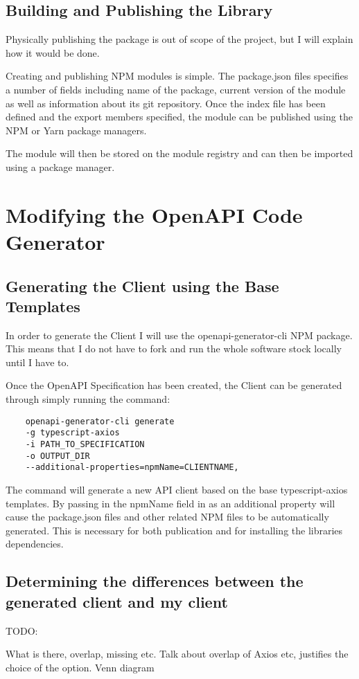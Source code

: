 \subsection{Building and Publishing the Library}
    Physically publishing the package is out of scope of the project, but I will explain how it would be done.

    Creating and publishing NPM modules is simple. The package.json files specifies a number of fields including name of the package, current version of the module as well as information about its git repository. Once the index file has been defined and the export members specified, the module can be published using the NPM or Yarn package managers.
    
    The module will then be stored on the module registry and can then be imported using a package manager. 
    
\section{Modifying the OpenAPI Code Generator}
\subsection{Generating the Client using the Base Templates}
In order to generate the Client I will use the openapi-generator-cli NPM package. This means that I do not have to fork and run the whole software stock locally until I have to.

Once the OpenAPI Specification has been created, the Client can be generated through simply running the command:
\begin{verbatim}
    openapi-generator-cli generate 
    -g typescript-axios 
    -i PATH_TO_SPECIFICATION
    -o OUTPUT_DIR
    --additional-properties=npmName=CLIENTNAME,
\end{verbatim}
The command will generate a new API client based on the base typescript-axios templates. By passing in the npmName field in as an additional property will cause the package.json files and other related NPM files to be automatically generated. This is necessary for both publication and for installing the libraries dependencies.
\subsection{Determining the differences between the generated client and my client}
TODO:

What is there, overlap, missing etc. Talk about overlap of Axios etc, justifies the choice of the option.
Venn diagram
